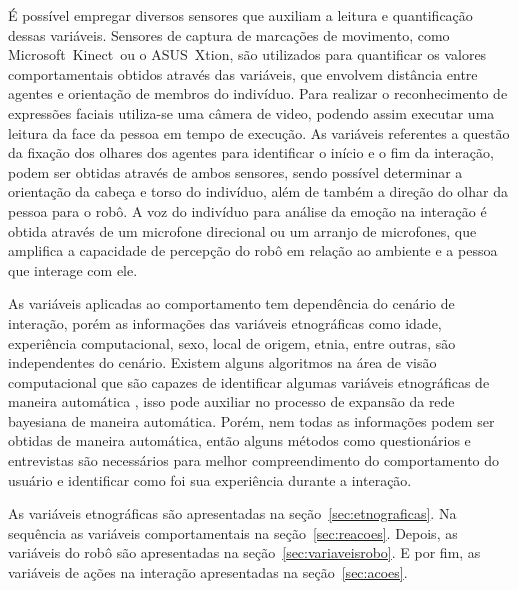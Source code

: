 É possível empregar diversos sensores que auxiliam a leitura e quantificação dessas variáveis. Sensores de captura de marcações de movimento, como Microsoft\textregistered\ Kinect\textregistered\ ou o ASUS\textregistered\ Xtion\textregistered, são utilizados para quantificar os valores comportamentais obtidos através das variáveis, que envolvem distância entre agentes e orientação de membros do indivíduo. Para realizar o reconhecimento de expressões faciais utiliza-se uma câmera de video, podendo assim executar uma leitura da face da pessoa em tempo de execução. As variáveis referentes a questão da fixação dos olhares dos agentes para identificar o início e o fim da interação, podem ser obtidas através de ambos sensores, sendo possível determinar a orientação da cabeça e torso do indivíduo, além de também a direção do olhar da pessoa para o robô. A voz do indivíduo para análise da emoção na interação é obtida através de um microfone direcional ou um arranjo de microfones, que amplifica a capacidade de percepção do robô em relação ao ambiente e a pessoa que interage com ele.

As variáveis aplicadas ao comportamento tem dependência do cenário de interação, porém as informações das variáveis etnográficas como idade, experiência computacional, sexo, local de origem, etnia, entre outras, são independentes do cenário. Existem alguns algoritmos na área de visão computacional que são capazes de identificar algumas variáveis etnográficas de maneira automática \cite{yang:2007, shan:2012, ylioinas:2012, samadi:2013, amaral:2014}, isso pode auxiliar no processo de expansão da rede bayesiana de maneira automática. Porém, nem todas as informações podem ser obtidas de maneira automática, então alguns métodos como questionários e entrevistas são necessários para melhor compreendimento do comportamento do usuário e identificar como foi sua experiência durante a interação.

As variáveis etnográficas são apresentadas na seção~\ref{sec:etnograficas}. Na sequência as variáveis comportamentais na seção~\ref{sec:reacoes}. Depois, as variáveis do robô são apresentadas na seção~\ref{sec:variaveisrobo}. E por fim, as variáveis de ações na interação apresentadas na seção~\ref{sec:acoes}.

